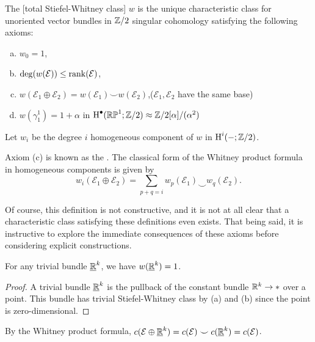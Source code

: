 \begin{definition}
	The [total Stiefel-Whitney class] $w$ is the unique characteristic class for unoriented vector bundles in $\mathbb{Z}/2$ singular cohomology satisfying the following axioms:
	\begin{enumerate}[(a)]
		\item $w_0=1$,
		\item $\deg(w(\mathcal{E}))\leq \operatorname{rank}(\mathcal{E})$,
		\item $w(\mathcal{E}_1\oplus \mathcal{E}_2)=w(\mathcal{E}_1)\smile w(\mathcal{E}_2)$,\hfill ($\mathcal{E}_1, \mathcal{E}_2$ have the same base)
		\item $w(\gamma^1_1)=1+\alpha$ \hfill in $\operatorname{H}^\bullet(\mathbb{RP}^1;\mathbb{Z}/2)\approx \mathbb{Z}/2[\alpha]/(\alpha^2)$
	\end{enumerate}
	Let $w_i$ be the degree $i$ homogeneous component of $w$ in $\operatorname{H}^i(-;\mathbb{Z}/2)$.
\end{definition}

\begin{remark}
	Axiom (c) is known as the . The classical form of the Whitney product formula in homogeneous components is given by
	\[
		w_i(\mathcal{E}_1\oplus \mathcal{E}_2) = \sum_{p+q=i} w_p(\mathcal{E}_1)\smile w_q(\mathcal{E}_2).
	\]
\end{remark}

Of course, this definition is not constructive, and it is not at all clear that a characteristic class satisfying these definitions even exists. That being said, it is instructive to explore the immediate consequences of these axioms before considering explicit constructions.

\begin{corollary}
	For any trivial bundle $\underline{\mathbb{R}}^k$, we have $w(\underline{\mathbb{R}}^k)=1$.
\end{corollary}
\begin{proof}
	A trivial bundle $\underline{\mathbb{R}}^k$ is the pullback of the constant bundle $\mathbb{R}^k\to *$ over a point. This bundle has trivial Stiefel-Whitney class by (a) and (b) since the point is zero-dimensional.
\end{proof}

\begin{corollary}
	By the Whitney product formula, $c(\mathcal{E}\oplus \underline{\mathbb{R}}^k)=c(\mathcal{E})\smile c(\underline{\mathbb{R}}^k)= c(\mathcal{E})$.
\end{corollary}

